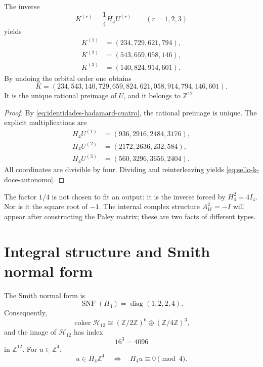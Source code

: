 \begin{theorem}
\label{thm:reconstruccion-entera-k-hadamard}
The inverse
\begin{equation}
 K^{(r)}=\frac14H_4U^{(r)}
 \qquad(r=1,2,3)
 \label{eq:inversion-bloques-hadamard}
\end{equation}
yields
\begin{align*}
 K^{(1)}&=(234,729,621,794),\\
 K^{(2)}&=(543,659,058,146),\\
 K^{(3)}&=(140,824,914,601).
\end{align*}
By undoing the orbital order one obtains
\begin{equation}
 \boxed{
 K=(234,543,140,729,659,824,621,058,914,794,146,601).}
 \label{eq:sello-k-doce-autonomo}
\end{equation}
It is the unique rational preimage of \(U\), and it belongs to
\(\mathbb Z^{12}\).
\end{theorem}

\begin{proof}
By \eqref{eq:identidades-hadamard-cuatro}, the rational preimage is unique. The explicit multiplications are
\begin{align*}
 H_4U^{(1)}&=(936,2916,2484,3176),\\
 H_4U^{(2)}&=(2172,2636,232,584),\\
 H_4U^{(3)}&=(560,3296,3656,2404).
\end{align*}
All coordinates are divisible by four. Dividing and reinterleaving
yields \eqref{eq:sello-k-doce-autonomo}.
\end{proof}

The factor \(1/4\) is not chosen to fit an output: it is the inverse
forced by \(H_4^2=4I_4\). Nor is it the square root of \(-1\). The
internal complex structure \(A_W^2=-I\) will appear after constructing the
Paley matrix; these are two facts of different types.

\section{Integral structure and Smith normal form}

\begin{theorem}
\label{thm:smith-hadamard-autonomo}
The Smith normal form is
\begin{equation}
 \operatorname{SNF}(H_4)=\operatorname{diag}(1,2,2,4).
 \label{eq:snf-hadamard-autonoma}
\end{equation}
Consequently,
\begin{equation}
 \operatorname{coker}\mathcal H_{12}
 \cong(\mathbb Z/2\mathbb Z)^6
 \oplus(\mathbb Z/4\mathbb Z)^3,
 \label{eq:cociente-hadamard-doce}
\end{equation}
and the image of \(\mathcal H_{12}\) has index
\[
 16^3=4096
\]
in \(\mathbb Z^{12}\). For \(u\in\mathbb Z^4\),
\begin{equation}
 u\in H_4\mathbb Z^4
 \quad\Longleftrightarrow\quad
 H_4u\equiv0\pmod4.
 \label{eq:criterio-imagen-hadamard}
\end{equation}
\end{theorem}

